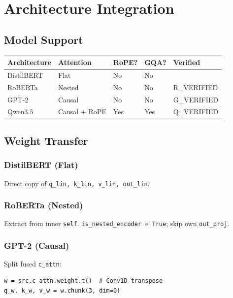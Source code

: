 
\section{Architecture Integration}

\subsection{Model Support}

\begin{table}[H]
\centering
\small
\begin{tabular}{lllll}
\toprule
\textbf{Architecture} & \textbf{Attention} & \textbf{RoPE?} & \textbf{GQA?} & \textbf{Verified} \\
\midrule
DistilBERT & Flat & No & No &  \\
RoBERTa & Nested & No & No & {{R\_VERIFIED}} \\
GPT-2 & Causal & No & No & {{G\_VERIFIED}} \\
Qwen3.5 & Causal + RoPE & Yes & Yes & {{Q\_VERIFIED}} \\
\bottomrule
\end{tabular}
\end{table}

\subsection{Weight Transfer}

\subsubsection{DistilBERT (Flat)}

Direct copy of \texttt{q\_lin, k\_lin, v\_lin, out\_lin}.

\subsubsection{RoBERTa (Nested)}

Extract from inner \texttt{self}. \texttt{is\_nested\_encoder = True}; skip own \texttt{out\_proj}.

\subsubsection{GPT-2 (Causal)}

Split fused \texttt{c\_attn}:

\begin{lstlisting}
w = src.c_attn.weight.t()  # Conv1D transpose
q_w, k_w, v_w = w.chunk(3, dim=0)
\end{lstlisting}

